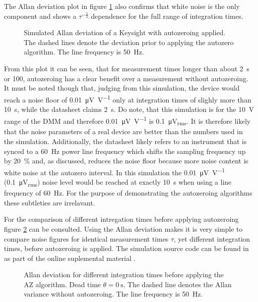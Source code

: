 The Allan deviation plot in figure \ref{fig:autozero_adev} also confirms that white noise is the only component and shows a $\tau^{-\frac 1 2}$ dependence for the full range of integration times.

\begin{figure}[hb]
    \centering
    
    \caption{Simulated Allan deviation of a Keysight  with autozeroing applied. The dashed lines denote the deviation prior to applying the autozero algorithm. The line frequency is \qty{50}{\Hz}.}
    \label{fig:autozero_adev}
\end{figure}

From this plot it can be seen, that for measurement times longer than about \qty{2}{\s} or \qty{100}{\plc}, autozeroing has a clear benefit over a measurement without autozeroing. It must be noted though that, judging from this simulation, the device would reach a noise floor of \qty[per-mode = symbol]{0.01}{\uV \per \V} only at integration times of slighly more than \qty{10}{\s}, while the datasheet claims \qty{2}{\s}. Do note, that this simulation is for the \qty{10}{\V} range of the DMM and therefore \qty[per-mode = symbol]{0.01}{\uV \per \V} is \qty{0.1}{\uV_{rms}}. It is therefore likely that the noise parameters of a real device are better than the numbers used in the simulation. Additionally, the datasheet likely refers to an instrument that is synced to a \qty{60}{\Hz} power line frequency which shifts the sampling frequency up by \qty{20}{\percent} and, as discussed, reduces the noise floor because more noise content is white noise at the autozero interval. In this simulation the \qty{0.01}{\uV \per \V} (\qty{0.1}{\uV_{rms}}) noise level would be reached at exactly \qty{10}{\s} when using a line frequency of \qty{60}{\Hz}. For the purpose of demonstrating the autozeroing algorithms these subtleties are irrelavant.

For the comparison of different intregation times before applying autozeroing figure \ref{fig:autozero_nplcs_adev} can be consulted. Using the Allan deviation makes it is very simple to compare noise figures for identical measurement times $\tau$, yet different integration times, before autozeroing is applied. The simulation source code can be found in  as part of the online suplemental material \cite{supplemental_material}.

\begin{figure}[ht]
    \centering
    
    \caption{Allan deviation for different integration times before applying the AZ algorithm. Dead time $\theta = \qty{0}{\s}$. The dashed line denotes the Allan variance without autozeroing. The line frequency is \qty{50}{\Hz}.}
    \label{fig:autozero_nplcs_adev}
\end{figure}

